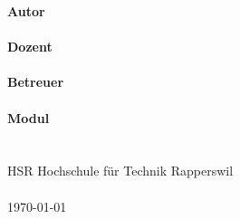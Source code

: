 \begin{titlepage}
	
	\begin{adjustwidth}{-25mm}{-45mm}
		\begin{adjustwidth}{65mm}{10mm}
			\textsf{
				\vspace*{4cm}
				\begin{flushleft}
					\Huge \textbf{\Title}\\
					\vspace{.25cm}
					\Large \sffamily\TitleInfo \\
				\end{flushleft}
			}
		\end{adjustwidth}
		
		\begin{adjustwidth}{35mm}{40mm}	
			\vfill
			\large
			\textsf{\textbf{Autor}}\\
			\textsf{\Author} \\
			\textsf{\textbf{Dozent}}\\
			\textsf{\Prof}\\
			\textsf{\textbf{Betreuer}}\\
			\textsf{\Betreuer}\\
			\textsf{\textbf{Modul}}\\
			\textsf{\Modul}\\
			\hfill\hbox{}\\
			\textsf{HSR Hochschule für Technik Rapperswil}\\
			\hfill\hbox{}\\
			\textsf{\today}
            \vspace{3cm}
		\end{adjustwidth}		
	\end{adjustwidth}
\end{titlepage}
